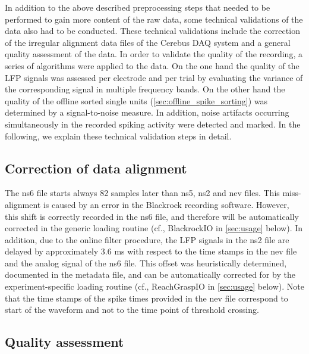 {In addition to the above described preprocessing steps that needed to be performed to gain more content of the raw data, some technical validations of the data also had to be conducted. These technical validations include the correction of the irregular alignment data files of the Cerebus DAQ system and a general quality assessment of the data. In order to validate the quality of the recording, a series of algorithms were applied to the data. On the one hand the quality of the LFP signals was assessed per electrode and per trial by evaluating the variance of the corresponding signal in multiple frequency bands. On the other hand the quality of the offline sorted single units (\cref{sec:offline_spike_sorting}) was determined by a signal-to-noise measure. In addition, noise artifacts occurring simultaneously in the recorded spiking activity were detected and marked. In the following, we explain these technical validation steps in detail.

\subsection{Correction of data alignment}

The ns6 file starts always 82 samples later than ns5, ns2 and nev files. This miss-alignment is caused by an error in the Blackrock recording software. However, this shift is correctly recorded in the ns6 file, and therefore will be automatically corrected in the generic  loading routine (cf., BlackrockIO in \cref{sec:usage} below). In addition, due to the online filter procedure, the LFP signals in the ns2 file are delayed by approximately 3.6 ms with respect to the time stamps in the nev file and the analog signal of the ns6 file. This offset was heuristically determined, documented in the metadata file, and can be automatically corrected for by the experiment-specific loading routine (cf., ReachGraspIO in \cref{sec:usage} below). Note that the time stamps of the spike times provided in the nev file correspond to start of the waveform and not to the time point of threshold crossing.

\subsection{Quality assessment}

}
